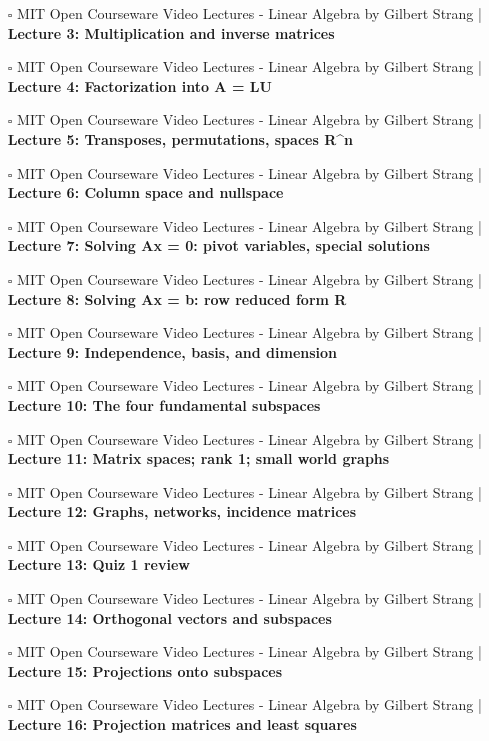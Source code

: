\documentclass[a4, landscape, 12pt]{article}
\newcommand{\checkbox}{$\square$}%
\begin{document}
\begin{itemize}
{}
\item [\checkbox] MIT Open Courseware Video Lectures - Linear Algebra by Gilbert Strang  | \textbf{Lecture 3: Multiplication and inverse matrices
}
\item [\checkbox] MIT Open Courseware Video Lectures - Linear Algebra by Gilbert Strang  | \textbf{Lecture 4: Factorization into A = LU
}
\item [\checkbox] MIT Open Courseware Video Lectures - Linear Algebra by Gilbert Strang  | \textbf{Lecture 5: Transposes, permutations, spaces R^n
}
\item [\checkbox] MIT Open Courseware Video Lectures - Linear Algebra by Gilbert Strang  | \textbf{Lecture 6: Column space and nullspace
}
\item [\checkbox] MIT Open Courseware Video Lectures - Linear Algebra by Gilbert Strang  | \textbf{Lecture 7: Solving Ax = 0: pivot variables, special solutions
}
\item [\checkbox] MIT Open Courseware Video Lectures - Linear Algebra by Gilbert Strang  | \textbf{Lecture 8: Solving Ax = b: row reduced form R
}
\item [\checkbox] MIT Open Courseware Video Lectures - Linear Algebra by Gilbert Strang  | \textbf{Lecture 9: Independence, basis, and dimension
}
\item [\checkbox] MIT Open Courseware Video Lectures - Linear Algebra by Gilbert Strang  | \textbf{Lecture 10: The four fundamental subspaces
}
\item [\checkbox] MIT Open Courseware Video Lectures - Linear Algebra by Gilbert Strang  | \textbf{Lecture 11: Matrix spaces; rank 1; small world graphs
}
\item [\checkbox] MIT Open Courseware Video Lectures - Linear Algebra by Gilbert Strang  | \textbf{Lecture 12: Graphs, networks, incidence matrices
}
\item [\checkbox] MIT Open Courseware Video Lectures - Linear Algebra by Gilbert Strang  | \textbf{Lecture 13: Quiz 1 review
}
\item [\checkbox] MIT Open Courseware Video Lectures - Linear Algebra by Gilbert Strang  | \textbf{Lecture 14: Orthogonal vectors and subspaces
}
\item [\checkbox] MIT Open Courseware Video Lectures - Linear Algebra by Gilbert Strang  | \textbf{Lecture 15: Projections onto subspaces
}
\item [\checkbox] MIT Open Courseware Video Lectures - Linear Algebra by Gilbert Strang  | \textbf{Lecture 16: Projection matrices and least squares
}
\end{itemize}
\end{document}

